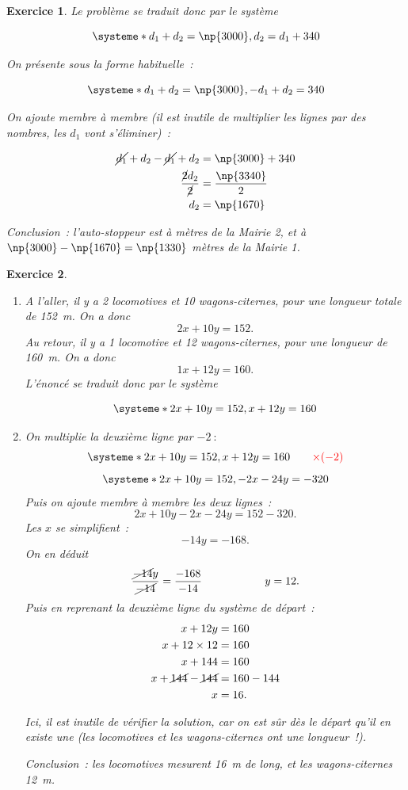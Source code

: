 \documentclass[10pt]{article}
\newtheorem{exo}{Exercice}
\begin{document}
\begin{exo}
\medskip

Le problème se traduit donc par le système

\[
\systeme*{d_1+d_2=\np{3000},d_2=d_1+340}
\]

On présente sous la forme habituelle~:

\[
\systeme*{d_1+d_2=\np{3000},-d_1+d_2=340}
\]

On ajoute membre à membre (il est inutile de multiplier les lignes par des nombres, les $d_1$ vont s'éliminer)~:

\begin{align*}\cancel{d_1}+d_2-\cancel{d_1}+d_2&=\np{3000}+340\\
\frac{\cancel{2}d_2}{\cancel{2}}&=\frac{\np{3340}}{2}\\
d_2&=\np{1670}
\end{align*}

Conclusion~: l'auto-stoppeur est à  mètres de la Mairie 2, et à $\np{3000}-\np{1670}=\np{1330}$ mètres de la Mairie 1.

\end{exo}



\begin{exo}


\begin{enumerate}
\item A l'aller, il y a 2 locomotives et 10 wagons-citernes, pour une longueur totale de 152~m. On a donc
\[2x+10y=152.\] Au retour, il y a 1 locomotive et 12 wagons-citernes, pour une longueur de 160~m. On a donc \[1x+12y=160.\] L'énoncé se traduit donc par le système

\[
\systeme*{2x+10y=152,x+12y=160}
\]
\item On multiplie la deuxième ligne par $-2~:$
\[
\systeme*{2x+10y=152,x+12y=160\textcolor{red}{\qquad\times (-2)}}
\]
\[
\systeme*{2x+10y=152,-2x-24y=-320}
\]
Puis on ajoute membre à membre les deux lignes~:
\[
2x+10y-2x-24y=152-320.\] Les $x$ se simplifient~:
\[-14y=-168.\] On en déduit
\[\frac{\cancel{-14}y}{\cancel{-14}}=\frac{-168}{-14}\hspace{2cm}y=12.\]
Puis en reprenant la deuxième ligne du système de départ~:
\begin{align*}
x+12y&=160\\
x+12\times 12&=160\\
x+144&=160\\
x+\cancel{144}-\cancel{144}&=160-144\\
x&=16.\end{align*}

\medskip

Ici, il est inutile de vérifier la solution, car on est sûr dès le départ qu'il en existe une (les locomotives et les wagons-citernes ont une longueur~!).

\medskip

Conclusion~: les locomotives mesurent 16~m de long, et les wagons-citernes 12~m.

\end{enumerate}

\end{exo}
\end{document}
